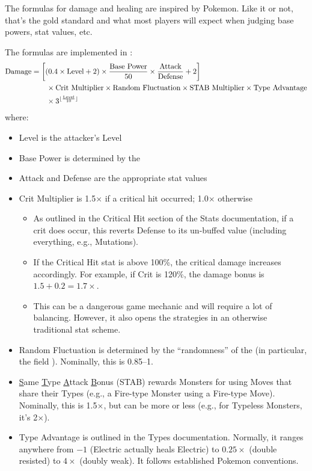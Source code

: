 

The formulas for damage and healing are inspired by Pokemon. Like it or not, that's the gold standard and what most players will expect when judging base powers, stat values, etc.

The formulas are implemented in :
\begin{align*}
	\text{Damage} &= \left[\left(0.4\times \text{Level} + 2\right) \times \frac{\text{Base Power}}{50} \times \frac{\text{Attack}}{\text{Defense}} + 2\right]\\
		& \qquad \times \text{Crit Multiplier} \times \text{Random Fluctuation} \times \text{STAB Multiplier} \times \text{Type Advantage}\\
		& \qquad \times 3^{\lfloor\frac{\text{Level}}{10}\rfloor}
\end{align*}
where:
\begin{itemize}
	\item{Level is the attacker's Level}
	\item{Base Power is determined by the }
	\item{Attack and Defense are the appropriate stat values}
	\item{Crit Multiplier is 1.5$\times$ if a critical hit occurred; 1.0$\times$ otherwise
		\begin{itemize}
			\item{As outlined in the Critical Hit section of the Stats documentation, if a crit does occur, this reverts Defense to its un-buffed value (including everything, e.g., Mutations).}
			\item{If the Critical Hit stat is above 100\%, the critical damage increases accordingly. For example, if Crit is 120\%, the damage bonus is $1.5 + 0.2 = 1.7\times$.}
			\item{This can be a dangerous game mechanic and will require a lot of balancing. However, it also opens the strategies in an otherwise traditional stat scheme.}
		\end{itemize}
	}
	\item{Random Fluctuation is determined by the ``randomness'' of the  (in particular, the field ). Nominally, this is 0.85--1.}
	\item{\ul{S}ame \ul{T}ype \ul{A}ttack \ul{B}onus (STAB) rewards Monsters for using Moves that share their Types (e.g., a Fire-type Monster using a Fire-type Move). Nominally, this is 1.5$\times$, but can be more or less (e.g., for Typeless Monsters, it's 2$\times$).}
	\item{Type Advantage is outlined in the Types documentation. Normally, it ranges anywhere from $-1$ (Electric actually heals Electric) to $0.25\times$ (double resisted) to $4\times$ (doubly weak). It follows established Pokemon conventions.}
\end{itemize}
